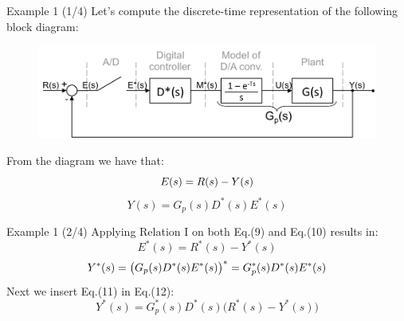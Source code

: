 \begin{frame}
	\begin{exampleblock}{Example 1 (1/4)}
		Let's compute the discrete-time representation of the following block diagram:
		\vspace{-1em}
		\begin{figure}
		\centering
		\includegraphics[width=1\linewidth]{block_analysis_2}
		\end{figure}
		From the diagram we have that:
		\vspace{-1em} 
		\begin{equation}
			E(s) = R(s) - Y(s)
			\vspace{-1em}
		\end{equation}
		\begin{equation}
			Y(s) = G_p(s)D^{*}(s)E^{*}(s)
		\end{equation}
	\end{exampleblock}
\end{frame}

\begin{frame}
	\begin{exampleblock}{Example 1 (2/4)}
		Applying Relation I on both Eq.(9) and Eq.(10) results in:
		\begin{equation}
		E^{*}(s) = R^{*}(s) - Y^{*}(s)
		\end{equation}
		\begin{equation}
		Y^{*}(s) = \big ( G_p(s)D^{*}(s)E^{*}(s) \big )^{*} = G_p^{*}(s)D^{*}(s)E^{*}(s)
		\vspace{1.5em}
		\end{equation}
		Next we insert Eq.(11) in Eq.(12):
		\begin{equation}
		Y^{*}(s) = G_p^{*}(s)D^{*}(s) \big ( R^{*}(s) - Y^{*}(s) \big)
		\end{equation}
	\end{exampleblock}
\end{frame}

